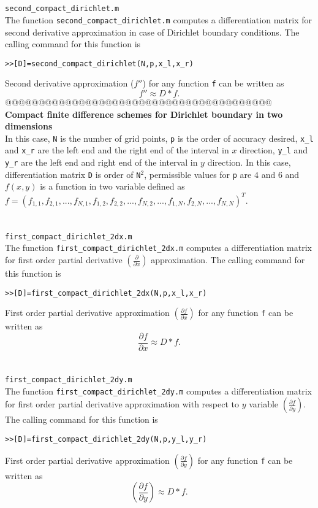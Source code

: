 \documentclass[acmtoms]{acmtrans2m}
\begin{document}
\section{} \verb#second_compact_dirichlet.m#\\
 The function \verb#second_compact_dirichlet.m# computes a differentiation matrix for second derivative approximation in case of Dirichlet boundary conditions. The calling command for this function is
\begin{alltt}
>>[D]=second_compact_dirichlet(N,p,x_l,x_r)
\end{alltt}
Second derivative approximation ($f''$) for any function \verb#f# can be written as
\[
f''\approx D*f.
\]
@@@@@@@@@@@@@@@@@@@@@@@@@@@@@@@@@@@@@@@@\\
\textbf{Compact finite difference schemes for Dirichlet boundary in two dimensions}\\
 In this case, \verb#N# is the number of grid points, \verb#p# is the order of accuracy desired, \verb#x_l# and \verb#x_r#  are the left end and the right end of the interval in $x$ direction, \verb#y_l# and \verb#y_r# are the left end and right end of the interval in $y$ direction. In this case, differentiation matrix \verb#D# is order of \verb#N#$^2$, permissible values for \verb#p# are $4$ and $6$ and $f(x,y)$ is a function in two variable defined as $f=(f_{1,1},f_{2,1},...,f_{N,1},f_{1,2},f_{2,2},...,f_{N,2},...,f_{1,N},f_{2,N},...,f_{N,N})^T$.
\section{} \verb#first_compact_dirichlet_2dx.m#\\
 The function \verb#first_compact_dirichlet_2dx.m# computes a differentiation matrix for first order partial derivative $(\frac{\partial}{\partial x})$ approximation. The calling command for this function is
\begin{alltt}
>>[D]=first_compact_dirichlet_2dx(N,p,x_l,x_r)
\end{alltt}
First order partial derivative approximation $\left(\frac{\partial f}{\partial x}\right)$ for any function \verb#f# can be written as
\[
\frac{\partial f}{\partial x}\approx D*f.
\]
\section{} \verb#first_compact_dirichlet_2dy.m#\\
 The function \verb#first_compact_dirichlet_2dy.m# computes a differentiation matrix for first order partial derivative approximation with respect to $y$ variable $\left(\frac{\partial f}{\partial y}\right)$. The calling command for this function is
\begin{alltt}
>>[D]=first_compact_dirichlet_2dy(N,p,y_l,y_r)
\end{alltt}
First order partial derivative approximation $\left(\frac{\partial f}{\partial y}\right)$ for any function \verb#f# can be written as
\[
\left(\frac{\partial f}{\partial y}\right)\approx D*f.
\]
\end{document}
